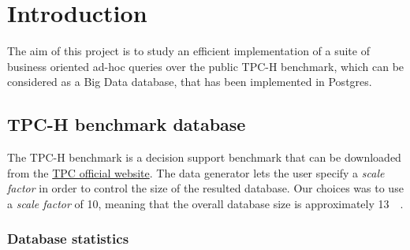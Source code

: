 

\section{Introduction}

The aim of this project is to study an efficient implementation of a suite of business oriented ad-hoc queries over the public TPC-H benchmark, which can be considered as a Big Data database, that has been implemented in Postgres.

\subsection{TPC-H benchmark database}

The TPC-H benchmark is a decision support benchmark that can be downloaded from the \href{https://www.tpc.org/tpch/}{TPC official website}. The data generator lets the user specify a \textit{scale factor} in order to control the size of the resulted database. Our choices was to use a \textit{scale factor} of \num{10}, meaning that the overall database size is approximately \SI{13}{\giga\byte}.

\subsubsection{Database statistics}

